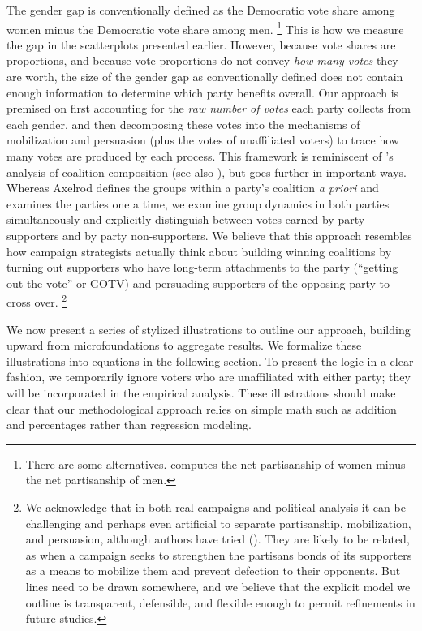 \documentclass[12pt
               ,final
               ]{article}
\begin{document}
The gender gap is conventionally defined as the Democratic vote share among women minus the Democratic vote share among men.%
 \footnote{There are some alternatives. \citet{norris2003} computes the net partisanship of women minus the net partisanship of men.} 
This is how we measure the gap in the scatterplots presented earlier. However, because vote shares are proportions, and because vote proportions do not convey \emph{how many votes} they are worth, the size of the gender gap as conventionally defined does not contain enough information to determine which party benefits overall. Our approach is premised on first accounting for the \emph{raw number of votes} each party collects from each gender, and then decomposing these votes into the mechanisms of mobilization and persuasion (plus the votes of unaffiliated voters) to trace how many votes are produced by each process. This framework is reminiscent of \citet{axelrod1972votes}'s analysis of coalition composition (see also \citealt{stanley1986partisanship}), but goes further in important ways. Whereas Axelrod defines the groups within a party's coalition \emph{a priori} and examines the parties one a time, we examine group dynamics in both parties simultaneously and explicitly distinguish between votes earned by party supporters and by party non-supporters. We believe that this approach resembles how campaign strategists actually think about building winning coalitions by turning out supporters who have long-term attachments to the party (``getting out the vote'' or GOTV) and persuading supporters of the opposing party to cross over.%
 \footnote{We acknowledge that in both real campaigns and political analysis it can be challenging and perhaps even artificial to separate partisanship, mobilization, and persuasion, although authors have tried (\citealt{huber2007identifying}). They are likely to be related, as when a campaign seeks to strengthen the partisans bonds of its supporters as a means to mobilize them and prevent defection to their opponents. But lines need to be drawn somewhere, and we believe that the explicit model we outline is transparent, defensible, and flexible enough to permit refinements in future studies.}

We now present a series of stylized illustrations to outline our approach, building upward from microfoundations to aggregate results. We formalize these illustrations into equations in the following section. To present the logic in a clear fashion, we temporarily ignore voters who are unaffiliated with either party; they will be incorporated in the empirical analysis. These illustrations should make clear that our methodological approach relies on simple math such as addition and percentages rather than regression modeling.
\end{document}
